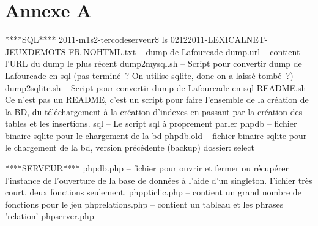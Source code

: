 \documentclass[a4paper,11pt,french]{article}
\begin{document}
{%






\section{Annexe A}


****SQL****
2011-m1s2-ter\/code\/serveur\$ ls
02122011-LEXICALNET-JEUXDEMOTS-FR-NOHTML.txt  -- dump de Lafourcade
dump.url -- contient l'URL du dump le plus récent
dump2mysql.sh -- Script pour convertir dump de Lafourcade en sql (pas terminé~? On utilise sqlite, donc on a laissé tombé~?)
dump2sqlite.sh  -- Script pour convertir dump de Lafourcade en sql
README.sh -- Ce n'est pas un README, c'est un script pour faire l'ensemble de la création de la BD, du téléchargement à la création d'indexes en passant par la création des tables et les insertions.
sql -- Le script sql à proprement parler
php\/db -- fichier binaire sqlite pour le chargement de la bd
php\/db.old -- fichier binaire sqlite pour le chargement de la bd, version précédente (backup)
dossier: select

****SERVEUR****
php\/db.php -- fichier pour ouvrir et fermer ou récupérer l'instance de l'ouverture de la base de données à l'aide d'un singleton. 
		Fichier très court, deux fonctions seulement.
php\/pticlic.php -- contient un grand nombre de fonctions pour le jeu
php\/relations.php -- contient un tableau et les phrases 'relation'
php\/server.php --



}
\end{document}
